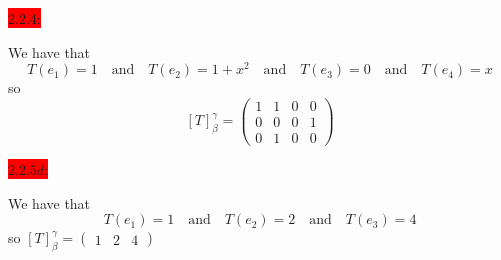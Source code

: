 \documentclass{exam}
\begin{document}
\begin{solution}
  \end{solution}


  \colorbox{red}{\underline{$2.2.4$}:}
  \begin{solution}
    We have that 
    \[
      T(e_1) = 1 
      \quad\text{and}\quad
      T(e_2) = 1+x^2
      \quad\text{and}\quad 
      T(e_3) = 0
      \quad\text{and}\quad 
      T(e_4) = x
    \]
    so 
    \[
      \left[T\right]_{\beta}^{\gamma} = \begin{pmatrix}
        1 & 1 & 0 & 0 \\
        0 & 0 & 0 & 1 \\
        0 & 1 & 0 & 0 
      \end{pmatrix}
    \]
  \end{solution}

  \colorbox{red}{\underline{$2.2.5d$}:}
  \begin{solution}
    We have that 
    \[
      T(e_1) = 1 
      \quad\text{and}\quad 
      T(e_2) = 2 
      \quad\text{and}\quad
      T(e_3) = 4  
    \]
    so 
    \(
      \left[T\right]_{\beta}^{\gamma} = \begin{pmatrix}
        1 & 2 & 4
      \end{pmatrix}
    \)
  \end{solution}
\end{document}
